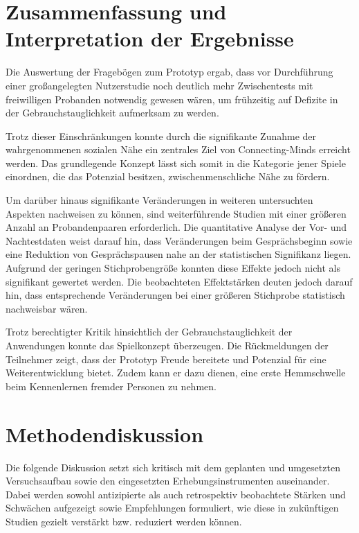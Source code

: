 \section{Zusammenfassung und Interpretation der Ergebnisse}

Die Auswertung der Fragebögen zum Prototyp ergab, dass vor Durchführung einer großangelegten Nutzerstudie noch deutlich mehr Zwischentests mit freiwilligen Probanden notwendig gewesen wären, um frühzeitig auf Defizite in der Gebrauchstauglichkeit aufmerksam zu werden.

Trotz dieser Einschränkungen konnte durch die signifikante Zunahme der wahrgenommenen sozialen Nähe ein zentrales Ziel von Connecting-Minds erreicht werden. Das grundlegende Konzept lässt sich somit in die Kategorie jener Spiele einordnen, die das Potenzial besitzen, zwischenmenschliche Nähe zu fördern.

Um darüber hinaus signifikante Veränderungen in weiteren untersuchten Aspekten nachweisen zu können, sind weiterführende Studien mit einer größeren Anzahl an Probandenpaaren erforderlich. Die quantitative Analyse der Vor- und Nachtestdaten weist darauf hin, dass Veränderungen beim Gesprächsbeginn sowie eine Reduktion von Gesprächspausen nahe an der statistischen Signifikanz liegen. Aufgrund der geringen Stichprobengröße konnten diese Effekte jedoch nicht als signifikant gewertet werden. Die beobachteten Effektstärken deuten jedoch darauf hin, dass entsprechende Veränderungen bei einer größeren Stichprobe statistisch nachweisbar wären.

Trotz berechtigter Kritik hinsichtlich der Gebrauchstauglichkeit der Anwendungen konnte das Spielkonzept überzeugen. Die Rückmeldungen der Teilnehmer zeigt, dass der Prototyp Freude bereitete und Potenzial für eine Weiterentwicklung bietet. Zudem kann er dazu dienen, eine erste Hemmschwelle beim Kennenlernen fremder Personen zu nehmen.

\section{Methodendiskussion}

Die folgende Diskussion setzt sich kritisch mit dem geplanten und umgesetzten Versuchsaufbau sowie den eingesetzten Erhebungsinstrumenten auseinander. Dabei werden sowohl antizipierte als auch retrospektiv beobachtete Stärken und Schwächen aufgezeigt sowie Empfehlungen formuliert, wie diese in zukünftigen Studien gezielt verstärkt bzw. reduziert werden können.

